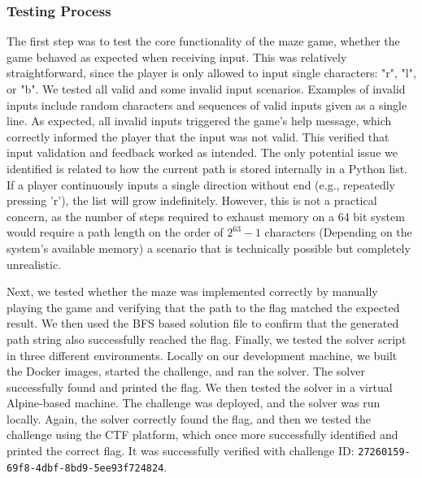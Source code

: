 \subsubsection{Testing Process}
The first step was to test the core functionality of the maze game, whether the game behaved as expected when receiving input. This was relatively straightforward, since the player is only allowed to input single characters: "r", "l", or "b". We tested all valid and some invalid input scenarios. Examples of invalid inputs include random characters and sequences of valid inputs given as a single line.
As expected, all invalid inputs triggered the game’s help message, which correctly informed the player that the input was not valid. This verified that input validation and feedback worked as intended. The only potential issue we identified is related to how the current path is stored internally in a Python list. If a player continuously inputs a single direction without end (e.g., repeatedly pressing 'r'), the list will grow indefinitely. However, this is not a practical concern, as the number of steps required to exhaust memory on a 64 bit system would require a path length on the order of $2^{63} - 1$ characters\cite{python_maxsize} (Depending on the system's available memory) a scenario that is technically possible but completely unrealistic.


Next, we tested whether the maze was implemented correctly by manually playing the game and verifying that the path to the flag matched the expected result. We then used the BFS based solution file to confirm that the generated path string also successfully reached the flag. Finally, we tested the solver script in three different environments. Locally on our development machine, we built the Docker images, started the challenge, and ran the solver. The solver successfully found and printed the flag. We then tested the solver in a virtual Alpine-based machine. The challenge was deployed, and the solver was run locally. Again, the solver correctly found the flag, and then we tested the challenge using the CTF platform, which once more successfully identified and printed the correct flag. It was successfully verified with challenge ID: \texttt{27260159-69f8-4dbf-8bd9-5ee93f724824}.

